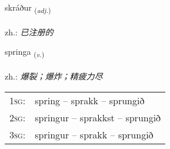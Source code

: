 \documentclass[frontgrid, backgrid]{flacards}\usepackage[]{graphicx}\usepackage[]{xcolor}
\begin{document}
\renewcommand{\flhead}{\vskip5pt \fboxsep=0pt {\small\bfseries\footnotesize Lýsingarorð | 形容词}}
\renewcommand{\fcfoot}{\vskip5pt \fboxsep=0pt \hspace{2pt}{\small\bfseries\footnotesize 3K}}

\renewcommand{\blhead}{\vskip5pt {\small\bfseries\footnotesize Lýsingarorð | 形容词 }}
\renewcommand{\bcfoot}{\vskip5pt \hspace{2pt}{\small\bfseries\footnotesize 3K}}


{skráður \small{\textsubscript{(\textit{adj.})}} \\[1ex] %
\textphonetic{[skrauːðʏr]} \\
zh.: \emph{已注册的} \\  [2ex]
\renewcommand*{\arraystretch}{0.8}
}

\renewcommand{\flhead}{\vskip5pt \fboxsep=0pt {\small\bfseries\footnotesize Sagnorð | 动词}}
\renewcommand{\fcfoot}{\vskip5pt \fboxsep=0pt \hspace{2pt}{\small\bfseries\footnotesize 3K}}

\renewcommand{\blhead}{\vskip5pt {\small\bfseries\footnotesize Sagnorð | 动词 }}
\renewcommand{\bcfoot}{\vskip5pt \hspace{2pt}{\small\bfseries\footnotesize 3K}}


{springa \small{\textsubscript{(\textit{v.})}} \\[1ex] %
\textphonetic{[spriŋka]} \\
zh.: \emph{爆裂；爆炸；精疲力尽} \\  [2ex]
\renewcommand*{\arraystretch}{0.8}
\begin{tabular}{p{1cm}l}
\textsc{1sg}: & spring -- sprakk -- sprungið \\ 
\textsc{2sg}: & springur -- sprakkst -- sprungið \\ 
\textsc{3sg}: & springur -- sprakk -- sprungið \\ 
\end{tabular}
}
\end{document}

